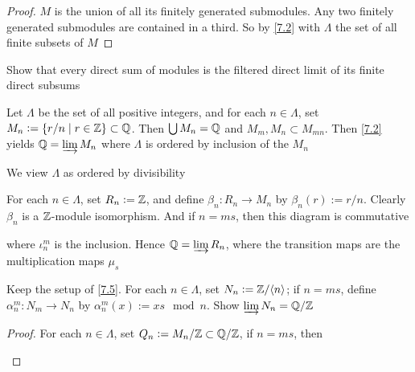 \documentclass[11pt]{article}
\begin{document}
\begin{proof}
\(M\) is the union of all its finitely generated submodules. Any two finitely
generated submodules are contained in a third. So by \ref{7.2} with  \(\Lambda\) the set of
all finite subsets of \(M\)
\end{proof}

\begin{exercise}
\label{7.4}
Show that every direct sum of modules is the filtered direct limit of its
finite direct subsums
\end{exercise}

\begin{examplle}[]
\label{7.5}
Let \(\Lambda\) be the set of all positive integers, and for each \(n\in\Lambda\), set
\(M_n:=\{r/n\mid r\in\mathbb{Z}\}\subset\mathbb{Q}\). Then \(\bigcup M_n=\mathbb{Q}\) and
\(M_m,M_n\subset M_{mn}\). Then \ref{7.2} yields \(\mathbb{Q}=\varinjlim M_n\) where \(\Lambda\)
is ordered by inclusion of the \(M_n\)

We view \(\Lambda\) as ordered by divisibility

For each \(n\in\Lambda\), set \(R_n:=\mathbb{Z}\), and define \(\beta_n:R_n\to M_n\)
by \(\beta_n(r):=r/n\). Clearly \(\beta_n\) is a \(\mathbb{Z}\)-module isomorphism.
And if \(n=ms\), then this diagram is commutative
\begin{center}
\end{center}
where \(\iota_n^m\) is the inclusion. Hence \(\mathbb{Q}=\varinjlim R_n\), where the
transition maps are the multiplication maps \(\mu_s\)
\end{examplle}

\begin{exercise}
\label{7.6}
Keep the setup of \ref{7.5}. For each \(n\in\Lambda\), set \(N_n:=\mathbb{Z}/\langle
   n\rangle\); if \(n=ms\), define \(\alpha_n^m: N_m\to N_n\) by \(\alpha^m_n(x):=xs\mod
   n\). Show \(\varinjlim N_n=\mathbb{Q}/\mathbb{Z}\)
\end{exercise}

\begin{proof}
For each \(n\in\Lambda\), set \(Q_n:=M_n/\mathbb{Z}\subset\mathbb{Q}/\mathbb{Z}\), if \(n=ms\), then
\begin{center}
\end{center}
\end{proof}
\end{document}
